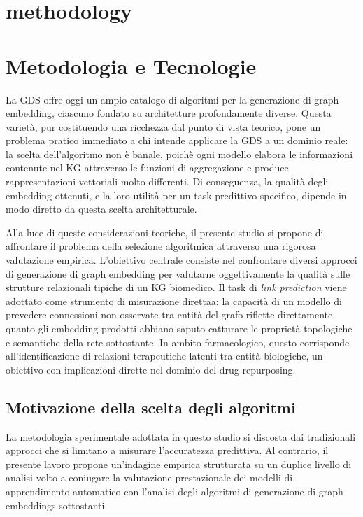 {\chapter{methodology}}
{\chapter{Metodologia e Tecnologie}}
\label{sec:methodology}

La GDS offre oggi un ampio catalogo di algoritmi per la generazione di graph embedding, ciascuno fondato su architetture profondamente diverse. Questa varietà, pur costituendo una ricchezza dal punto di vista teorico, pone un problema pratico immediato a chi intende applicare la GDS a un dominio reale: la scelta dell'algoritmo non è banale, poichè ogni modello elabora le informazioni contenute nel KG attraverso le funzioni di aggregazione  e produce rappresentazioni vettoriali molto differenti. Di conseguenza, la qualità degli embedding ottenuti, e la loro utilità per un task predittivo specifico, dipende in modo diretto da questa scelta architetturale.

Alla luce di queste considerazioni teoriche, il presente studio si propone di affrontare il problema della selezione algoritmica attraverso una rigorosa valutazione empirica. L'obiettivo centrale consiste nel confrontare diversi approcci di generazione di graph embedding per valutarne oggettivamente la qualità sulle strutture relazionali tipiche di un KG biomedico. Il task di \textit{link prediction} viene adottato come strumento di misurazione direttaa: la capacità di un modello di prevedere connessioni non osservate tra entità del grafo riflette direttamente quanto gli embedding prodotti abbiano saputo catturare le proprietà topologiche e semantiche della rete sottostante. In ambito farmacologico, questo corrisponde all'identificazione di relazioni terapeutiche latenti tra entità biologiche, un obiettivo con implicazioni dirette nel dominio del drug repurposing.

\section{Motivazione della scelta degli algoritmi}
La metodologia sperimentale adottata in questo studio si discosta dai tradizionali approcci che si limitano a misurare l'accuratezza predittiva. Al contrario, il presente lavoro propone un'indagine empirica strutturata su un duplice livello di analisi volto a coniugare la valutazione prestazionale dei modelli di apprendimento automatico con l'analisi degli algoritmi di generazione di graph embeddings sottostanti. 

